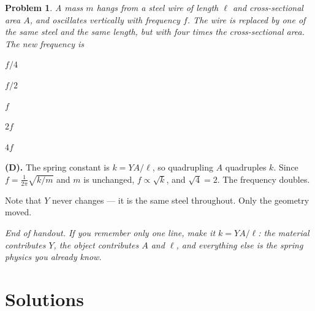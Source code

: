 \documentclass[11pt]{article}
\newcommand{\clearpts}{\addtocounter{tpts}{\value{cpts}} \setcounter{cpts}{0}}
\newcommand{\pts}[1]{\clearpts \setcounter{cpts}{#1}}
\theoremstyle{mystyle}
\newtheorem{pproblem}{Problem}
\newcommand{\printsolutions}{\clearpage\section*{Solutions}\the\soltoks}
\newcommand{\printsolutions}{}
\begin{document}
\pts{4}
\begin{pproblem}
A mass $m$ hangs from a steel wire of length $\ell$ and cross-sectional area $A$, and
oscillates vertically with frequency $f$. The wire is replaced by one of the same steel
and the same length, but with \emph{four times} the cross-sectional area. The new
frequency is
\begin{mcchoices}
\item $f/4$
\item $f/2$
\item $f$
\item $2f$
\item $4f$
\end{mcchoices}
\end{pproblem}
\begin{solution}
\textbf{(D).} The spring constant is $k = YA/\ell$, so quadrupling $A$ quadruples $k$.
Since $f = \frac{1}{2\pi}\sqrt{k/m}$ and $m$ is unchanged, $f \propto \sqrt{k}$, and
$\sqrt{4} = 2$. The frequency doubles.

Note that $Y$ never changes --- it is the same steel throughout. Only the geometry moved.
\end{solution}

\vspace{1em}
\begin{center}
\emph{End of handout. If you remember only one line, make it $k = YA/\ell$: the material
contributes $Y$, the object contributes $A$ and $\ell$, and everything else is the spring
physics you already know.}
\end{center}

\printsolutions
\end{document}
